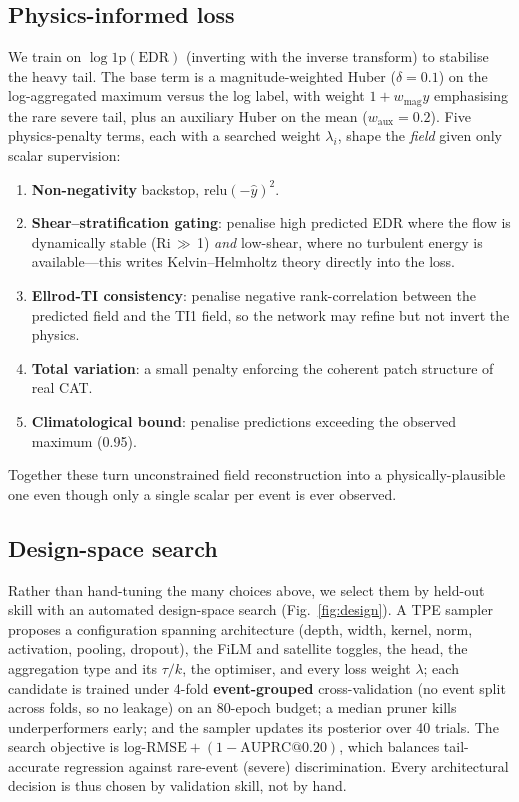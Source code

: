 \documentclass[11pt]{article}
\newcommand{\circnum}[1]{\ding{\the\numexpr181+#1\relax}}
\begin{document}
\subsection{\circnum{7} Physics-informed loss}
\label{sec:arch-loss}
We train on $\log\mathrm{1p}(\mathrm{EDR})$ (inverting with the inverse
transform) to stabilise the heavy tail. The base term is a
magnitude-weighted Huber ($\delta{=}0.1$) on the log-aggregated maximum
versus the log label, with weight $1+w_{\mathrm{mag}}y$ emphasising the
rare severe tail, plus an auxiliary Huber on the mean
($w_{\mathrm{aux}}{=}0.2$). Five physics-penalty terms, each with a
searched weight $\lambda_i$, shape the \emph{field} given only scalar
supervision:
\begin{enumerate}
  \item \textbf{Non-negativity} backstop, $\mathrm{relu}(-\hat{y})^2$.
  \item \textbf{Shear--stratification gating}: penalise high predicted
  EDR where the flow is dynamically stable (Ri\,$\gg$\,1) \emph{and}
  low-shear, where no turbulent energy is available---this writes
  Kelvin--Helmholtz theory directly into the loss.
  \item \textbf{Ellrod-TI consistency}: penalise negative rank-correlation
  between the predicted field and the TI1 field, so the network may refine
  but not invert the physics.
  \item \textbf{Total variation}: a small penalty enforcing the coherent
  patch structure of real CAT.
  \item \textbf{Climatological bound}: penalise predictions exceeding the
  observed maximum (0.95).
\end{enumerate}
Together these turn unconstrained field reconstruction into a
physically-plausible one even though only a single scalar per event is
ever observed.

\subsection{Design-space search}
\label{sec:arch-design}
Rather than hand-tuning the many choices above, we select them by
held-out skill with an automated design-space search
(Fig.~\ref{fig:design}). A TPE sampler proposes a configuration spanning
architecture (depth, width, kernel, norm, activation, pooling, dropout),
the FiLM and satellite toggles, the head, the aggregation type and its
$\tau/k$, the optimiser, and every loss weight $\lambda$; each candidate
is trained under 4-fold \textbf{event-grouped} cross-validation (no event
split across folds, so no leakage) on an 80-epoch budget; a median pruner
kills underperformers early; and the sampler updates its posterior over
40 trials. The search objective is
$\text{log-RMSE}+(1-\text{AUPRC}@0.20)$, which balances tail-accurate
regression against rare-event (severe) discrimination. Every architectural
decision is thus chosen by validation skill, not by hand.
\end{document}
